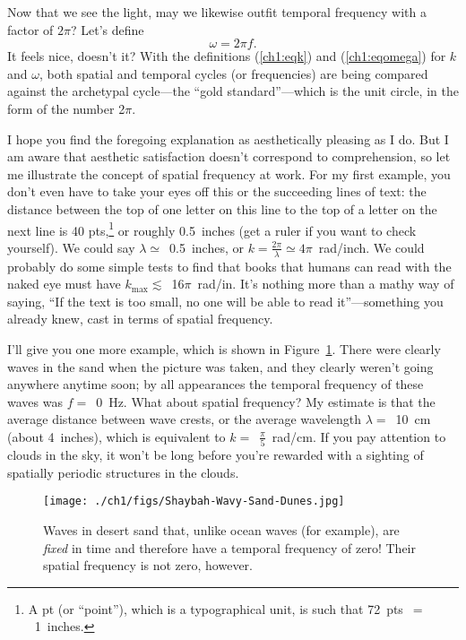 Now that we see the light, may we likewise outfit temporal frequency with a
factor of $2 \pi$? Let's define
\begin{equation}
  \label{ch1:eqomega}
  \omega = 2 \pi f.
\end{equation}
It feels nice, doesn't it? With the definitions (\ref{ch1:eqk}) and
(\ref{ch1:eqomega}) for $k$ and $\omega$, both spatial and temporal cycles (or
frequencies) are being compared against the archetypal cycle---the ``gold
standard''---which is the unit circle, in the form of the number 2$\pi$.

I hope you find the foregoing explanation as aesthetically pleasing as I do. But
I am aware that aesthetic satisfaction doesn't correspond to comprehension, so
let me illustrate the concept of spatial frequency at work. For my first
example, you don't even have to take your eyes off this or the succeeding lines
of text: the distance between the top of one letter on this line to the top of a
letter on the next line is 40 pts,\footnote{A pt (or ``point''), which is a
  typographical unit, is such that 72~pts~$=$~1~inches.}  or roughly 0.5~inches
(get a ruler if you want to check yourself). We could say
$\lambda \simeq$~0.5~inches, or
$k = \frac{2 \pi}{\lambda} \simeq 4 \pi$~rad/inch. We could probably do some
simple tests to find that books that humans can read with the naked eye must
have $k_{\textrm{max}} \lesssim$~16$\pi$~rad/in. It's nothing more than a mathy
way of saying, ``If the text is too small, no one will be able to read
it''---something you already knew, cast in terms of spatial frequency.

I'll give you one more example, which is shown in
Figure~\ref{ch1:FigDesert}. There were clearly waves in the sand when the
picture was taken, and they clearly weren't going anywhere anytime soon; by all
appearances the temporal frequency of these waves was $f =$~0~Hz.  What about
spatial frequency? My estimate is that the average distance between wave crests,
or the average wavelength $\lambda =$~10~cm (about 4~inches), which is
equivalent to $k =$~$\frac{\pi}{5}$~rad/cm.  If you pay attention to clouds in
the sky, it won't be long before you're rewarded with a sighting of spatially
periodic structures in the clouds.


\begin{figure}
  \centering
  \noindent\texttt{[image: ./ch1/figs/Shaybah-Wavy-Sand-Dunes.jpg]}
  \caption[Desert waves]{Waves in desert sand that, unlike ocean waves (for
    example), are \emph{fixed} in time and therefore have a temporal frequency of
    zero! Their spatial frequency is not zero, however.}
  \label{ch1:FigDesert}
\end{figure}

